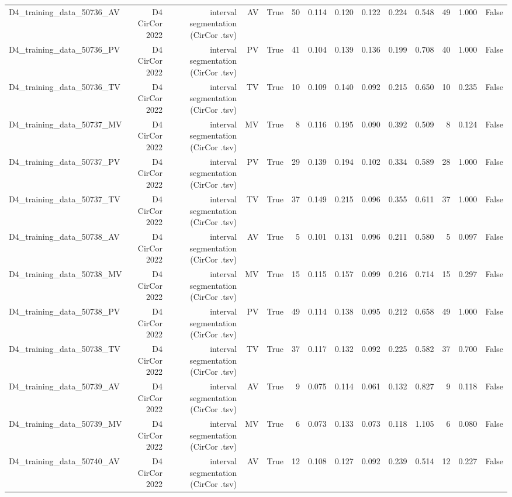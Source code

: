 \begin{table}[htbp]
\begin{tabular}{lrrrrrrrrrrrrr}
    D4\_training\_data\_50736\_AV & D4 CirCor 2022 & interval segmentation (CirCor .tsv) & AV & True & 50 & 0.114 & 0.120 & 0.122 & 0.224 & 0.548 & 49 & 1.000 & False \\
    D4\_training\_data\_50736\_PV & D4 CirCor 2022 & interval segmentation (CirCor .tsv) & PV & True & 41 & 0.104 & 0.139 & 0.136 & 0.199 & 0.708 & 40 & 1.000 & False \\
    D4\_training\_data\_50736\_TV & D4 CirCor 2022 & interval segmentation (CirCor .tsv) & TV & True & 10 & 0.109 & 0.140 & 0.092 & 0.215 & 0.650 & 10 & 0.235 & False \\
    D4\_training\_data\_50737\_MV & D4 CirCor 2022 & interval segmentation (CirCor .tsv) & MV & True & 8 & 0.116 & 0.195 & 0.090 & 0.392 & 0.509 & 8 & 0.124 & False \\
    D4\_training\_data\_50737\_PV & D4 CirCor 2022 & interval segmentation (CirCor .tsv) & PV & True & 29 & 0.139 & 0.194 & 0.102 & 0.334 & 0.589 & 28 & 1.000 & False \\
    D4\_training\_data\_50737\_TV & D4 CirCor 2022 & interval segmentation (CirCor .tsv) & TV & True & 37 & 0.149 & 0.215 & 0.096 & 0.355 & 0.611 & 37 & 1.000 & False \\
    D4\_training\_data\_50738\_AV & D4 CirCor 2022 & interval segmentation (CirCor .tsv) & AV & True & 5 & 0.101 & 0.131 & 0.096 & 0.211 & 0.580 & 5 & 0.097 & False \\
    D4\_training\_data\_50738\_MV & D4 CirCor 2022 & interval segmentation (CirCor .tsv) & MV & True & 15 & 0.115 & 0.157 & 0.099 & 0.216 & 0.714 & 15 & 0.297 & False \\
    D4\_training\_data\_50738\_PV & D4 CirCor 2022 & interval segmentation (CirCor .tsv) & PV & True & 49 & 0.114 & 0.138 & 0.095 & 0.212 & 0.658 & 49 & 1.000 & False \\
    D4\_training\_data\_50738\_TV & D4 CirCor 2022 & interval segmentation (CirCor .tsv) & TV & True & 37 & 0.117 & 0.132 & 0.092 & 0.225 & 0.582 & 37 & 0.700 & False \\
    D4\_training\_data\_50739\_AV & D4 CirCor 2022 & interval segmentation (CirCor .tsv) & AV & True & 9 & 0.075 & 0.114 & 0.061 & 0.132 & 0.827 & 9 & 0.118 & False \\
    D4\_training\_data\_50739\_MV & D4 CirCor 2022 & interval segmentation (CirCor .tsv) & MV & True & 6 & 0.073 & 0.133 & 0.073 & 0.118 & 1.105 & 6 & 0.080 & False \\
    D4\_training\_data\_50740\_AV & D4 CirCor 2022 & interval segmentation (CirCor .tsv) & AV & True & 12 & 0.108 & 0.127 & 0.092 & 0.239 & 0.514 & 12 & 0.227 & False \\

\end{tabular}
\end{table}
